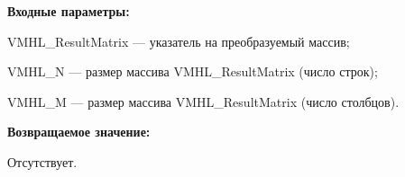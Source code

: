 \textbf{Входные параметры:}
 
VMHL\_ResultMatrix --- указатель на преобразуемый массив;
 
VMHL\_N --- размер массива VMHL\_ResultMatrix (число строк);
 
VMHL\_M --- размер массива VMHL\_ResultMatrix (число столбцов). 

\textbf{Возвращаемое значение:}

Отсутствует.